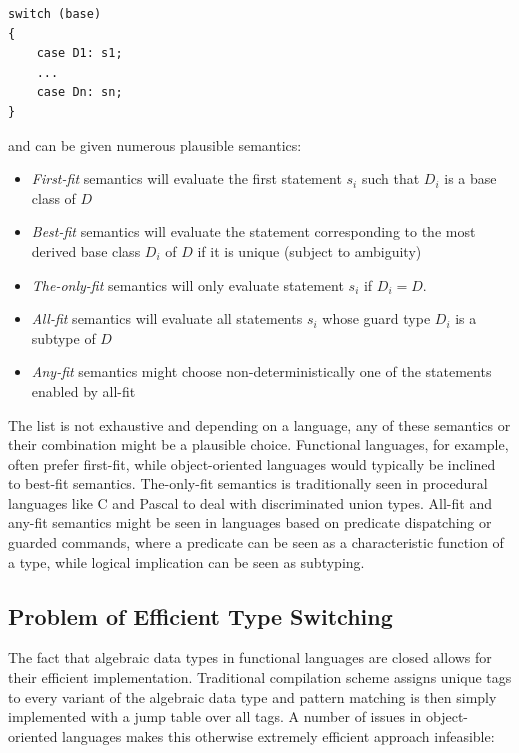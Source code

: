 \documentclass[preprint]{sigplanconf}
\begin{document}
\begin{lstlisting}
switch (base)
{
    case D1: s1;
    ...
    case Dn: sn;
}
\end{lstlisting}

\noindent and can be given numerous plausible semantics:

\begin{itemize}
\item \emph{First-fit} semantics will evaluate the first statement $s_i$ such 
      that $D_i$ is a base class of $D$
\item \emph{Best-fit} semantics will evaluate the statement corresponding to the 
      most derived base class $D_i$ of $D$ if it is unique (subject to 
      ambiguity)
\item \emph{The-only-fit} semantics will only evaluate statement $s_i$ if $D_i=D$.
\item \emph{All-fit} semantics will evaluate all statements $s_i$ whose guard 
      type $D_i$ is a subtype of $D$
\item \emph{Any-fit} semantics might choose non-deterministically one of the 
      statements enabled by all-fit
\end{itemize}

The list is not exhaustive and depending on a language, any of these semantics 
or their combination might be a plausible choice. Functional languages, for 
example, often prefer first-fit, while object-oriented languages would typically 
be inclined to best-fit semantics. The-only-fit semantics is traditionally seen 
in procedural languages like C and Pascal to deal with discriminated union types. 
All-fit and any-fit semantics might be seen in languages based on predicate 
dispatching\cite{ErnstKC98} or guarded commands\cite{EWD:EWD472}, where a 
predicate can be seen as a characteristic function of a type, while logical 
implication can be seen as subtyping.

\subsection{Problem of Efficient Type Switching}
\label{sec:poets}

The fact that algebraic data types in functional languages are closed allows for 
their efficient implementation. Traditional compilation scheme assigns unique 
tags to every variant of the algebraic data type and pattern matching is then 
simply implemented with a jump table over all tags. A number of issues in 
object-oriented languages makes this otherwise extremely efficient approach 
infeasible:
\end{document}
